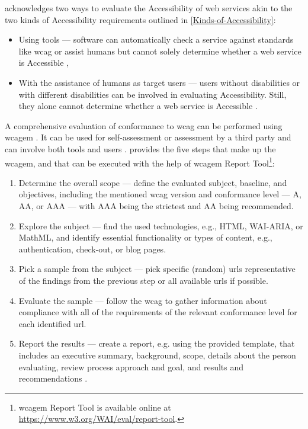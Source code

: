\textcite{WAI_Evaluation} acknowledges two ways to evaluate the Accessibility of web services akin to the two kinds of Accessibility requirements outlined in \ref{Kinds-of-Accessibility}:

\begin{itemize}
    \item Using tools --- software can automatically check a service against standards like \gls{wcag} or assist humans but cannot solely determine whether a web service is Accessible \parencite{WAI_Evaluation_Tools},
    \item With the assistance of humans as target users --- users without disabilities or with different disabilities can be involved in evaluating Accessibility. Still, they alone cannot determine whether a web service is Accessible \parencite{WAI_Evaluation_Users}.
\end{itemize}

A comprehensive evaluation of conformance to \gls{wcag} can be performed using \gls{wcagem} \parencite{WAI_Evaluation_Methodology}.
It can be used for self-assessment or assessment by a third party and can involve both tools and users \parencite{WAI_Evaluation_Methodology}.
\textcite{WAI_Evaluation_Methodology} provides the five steps that make up the \gls{wcagem}, and that can be executed with the help of \gls{wcagem} Report Tool\footnote{\gls{wcagem} Report Tool is available online at \url{https://www.w3.org/WAI/eval/report-tool}.}:

\begin{enumerate}
    \item Determine the overall scope --- define the evaluated subject, baseline, and objectives, including the mentioned \gls{wcag} version and conformance level --- A, AA, or AAA --- with AAA being the strictest and AA being recommended.
    \item Explore the subject --- find the used technologies, e.g., HTML, WAI-ARIA, or MathML, and identify essential functionality or types of content, e.g., authentication, check-out, or blog pages.
    \item Pick a sample from the subject --- pick specific (random) \glspl{url} representative of the findings from the previous step or all available \glspl{url} if possible.
    \item Evaluate the sample --- follow the \gls{wcag} to gather information about compliance with all of the requirements of the relevant conformance level for each identified \gls{url}.
    \item Report the results --- create a report, e.g. using the provided template, that includes an executive summary, background, scope, details about the person evaluating, review process approach and goal, and results and recommendations \parencite{WAI_Evalutation_Report}.
\end{enumerate}

